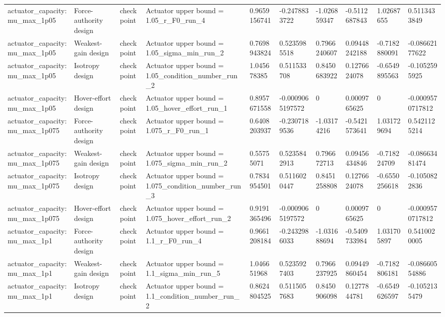 \begin{tabular}{@{}llllllllll@{}}
actuator\_capacity:mu\_max\_1p05 & Force-authority design & checkpoint & Actuator upper bound = 1.05\_r\_F0\_run\_4 & 0.9659156741 & -0.2478833722 & -1.026859347 & -0.5112687843 & 1.02687655 & 0.5113433849 \\
actuator\_capacity:mu\_max\_1p05 & Weakest-gain design & checkpoint & Actuator upper bound = 1.05\_sigma\_min\_run\_2 & 0.7698943824 & 0.5235985518 & 0.7966240607 & 0.09448242188 & -0.7182880091 & -0.08662177622 \\
actuator\_capacity:mu\_max\_1p05 & Isotropy design & checkpoint & Actuator upper bound = 1.05\_condition\_number\_run\_2 & 1.045678385 & 0.511533708 & 0.8450683922 & 0.1276624078 & -0.6549895563 & -0.1052595925 \\
actuator\_capacity:mu\_max\_1p05 & Hover-effort design & checkpoint & Actuator upper bound = 1.05\_hover\_effort\_run\_1 & 0.8957671558 & -0.0009065197572 & 0 & 0.0009765625 & 0 & -0.0009570717812 \\
actuator\_capacity:mu\_max\_1p075 & Force-authority design & checkpoint & Actuator upper bound = 1.075\_r\_F0\_run\_1 & 0.6408203937 & -0.2307189536 & -1.03174216 & -0.5421573641 & 1.031729694 & 0.5421125214 \\
actuator\_capacity:mu\_max\_1p075 & Weakest-gain design & checkpoint & Actuator upper bound = 1.075\_sigma\_min\_run\_2 & 0.55755071 & 0.5235842913 & 0.796672713 & 0.09456434846 & -0.718224709 & -0.08663481474 \\
actuator\_capacity:mu\_max\_1p075 & Isotropy design & checkpoint & Actuator upper bound = 1.075\_condition\_number\_run\_3 & 0.7834954501 & 0.5116020447 & 0.8451258808 & 0.1276624078 & -0.6550256618 & -0.1050822836 \\
actuator\_capacity:mu\_max\_1p075 & Hover-effort design & checkpoint & Actuator upper bound = 1.075\_hover\_effort\_run\_2 & 0.9191365496 & -0.0009065197572 & 0 & 0.0009765625 & 0 & -0.0009570717812 \\
actuator\_capacity:mu\_max\_1p1 & Force-authority design & checkpoint & Actuator upper bound = 1.1\_r\_F0\_run\_4 & 0.9661208184 & -0.2432986033 & -1.031688694 & -0.5409733984 & 1.031705897 & 0.5410020005 \\
actuator\_capacity:mu\_max\_1p1 & Weakest-gain design & checkpoint & Actuator upper bound = 1.1\_sigma\_min\_run\_5 & 1.046651968 & 0.5235927403 & 0.7966237925 & 0.09449860454 & -0.7182806181 & -0.08660554886 \\
actuator\_capacity:mu\_max\_1p1 & Isotropy design & checkpoint & Actuator upper bound = 1.1\_condition\_number\_run\_2 & 0.8624804525 & 0.5115057683 & 0.8450906098 & 0.1277844781 & -0.6549626597 & -0.1052135479 \\

\end{tabular}
